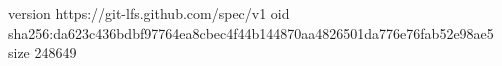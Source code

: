 version https://git-lfs.github.com/spec/v1
oid sha256:da623c436bdbf97764ea8cbec4f44b144870aa4826501da776e76fab52e98ae5
size 248649
